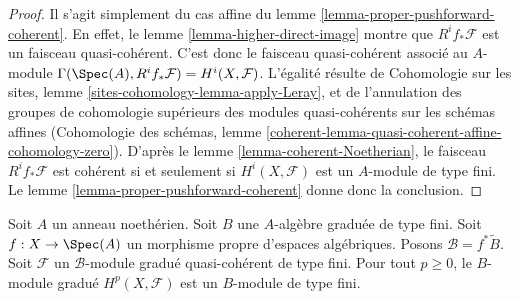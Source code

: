 \begin{proof}
Il s'agit simplement du cas affine du lemme \ref{lemma-proper-pushforward-coherent}.
En effet, le lemme \ref{lemma-higher-direct-image} montre que
$R^if_*\mathcal{F}$ est un faisceau quasi-cohérent. C'est donc le faisceau
quasi-cohérent associé au $A$-module
$\Gamma(\Spec(A), R^if_*\mathcal{F}) = H^i(X, \mathcal{F})$.
L'égalité résulte de
Cohomologie sur les sites, lemme \ref{sites-cohomology-lemma-apply-Leray},
et de l'annulation des groupes de cohomologie supérieurs des modules quasi-cohérents
sur les schémas affines (Cohomologie des schémas, lemme
\ref{coherent-lemma-quasi-coherent-affine-cohomology-zero}).
D'après le lemme \ref{lemma-coherent-Noetherian}, le faisceau $R^if_*\mathcal{F}$ est
cohérent si et seulement si $H^i(X, \mathcal{F})$
est un $A$-module de type fini. Le
lemme \ref{lemma-proper-pushforward-coherent} donne donc la conclusion.
\end{proof}

\begin{lemma}
\label{lemma-graded-finiteness}
Soit $A$ un anneau noethérien.
Soit $B$ une $A$-algèbre graduée de type fini.
Soit $f : X \to \Spec(A)$ un morphisme propre d'espaces algébriques.
Posons $\mathcal{B} = f^*\widetilde B$.
Soit $\mathcal{F}$ un $\mathcal{B}$-module gradué
quasi-cohérent de type fini.
Pour tout $p \geq 0$, le $B$-module gradué $H^p(X, \mathcal{F})$
est un $B$-module de type fini.
\end{lemma}

